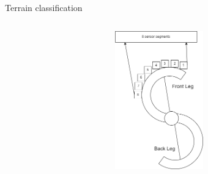\documentclass[aspectratio=169]{beamer}
\begin{document}
\begin{frame}[t]{Terrain classification}
\begin{columns}[T,onlytextwidth]
\begin{column}{0.49\textwidth}
\begin{figure}[H]
\begin{subfigure}{\textwidth}
                    \centering\includegraphics[height=6cm,width=1\textwidth,keepaspectratio]{s_shape_leg/leg_design.png}
                \end{subfigure}
            \end{figure}
        \end{column}
    \end{columns}
\end{frame}
\end{document}
